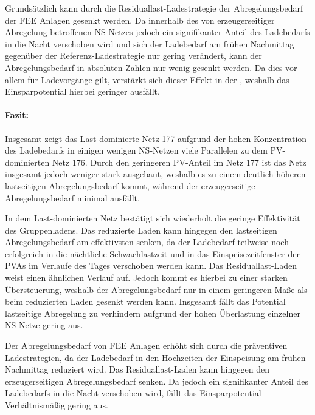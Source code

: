 

Grundsätzlich kann durch die Residuallast-Ladestrategie der Abregelungsbedarf der \gls{FEE} Anlagen gesenkt werden.
Da innerhalb des von erzeugerseitiger Abregelung betroffenen \gls{NS}-Netzes jedoch ein signifikanter Anteil des Ladebedarfs in die Nacht verschoben wird und sich der Ladebedarf am frühen Nachmittag gegenüber der Referenz-Ladestrategie nur gering verändert, kann der Abregelungsbedarf in absoluten Zahlen nur wenig gesenkt werden.
Da dies vor allem für Ladevorgänge \zH gilt, verstärkt sich dieser Effekt in der \SzeFirmenparkplatzdot, weshalb das Einsparpotential hierbei geringer ausfällt.


\paragraph{Fazit:}

Insgesamt zeigt das Last-dominierte Netz \num{177} aufgrund der hohen Konzentration des Ladebedarfs in einigen wenigen \gls{NS}-Netzen viele Parallelen zu dem \gls{PV}-dominierten Netz \num{176}.
Durch den geringeren \gls{PV}-Anteil im Netz \num{177} ist das Netz insgesamt jedoch weniger stark ausgebaut, weshalb es zu einem deutlich höheren lastseitigen Abregelungsbedarf kommt, während der erzeugerseitige Abregelungsbedarf minimal ausfällt.\medskip

In dem Last-dominierten Netz bestätigt sich wiederholt die geringe Effektivität des Gruppenladens.
Das reduzierte Laden kann hingegen den lastseitigen Abregelungsbedarf am effektivsten senken, da der Ladebedarf teilweise noch erfolgreich in die nächtliche Schwachlastzeit und in das Einspeisezeitfenster der \glspl{PVA} im Verlaufe des Tages verschoben werden kann.
Das Residuallast-Laden weist einen ähnlichen Verlauf auf.
Jedoch kommt es hierbei zu einer starken Übersteuerung, weshalb der Abregelungsbedarf nur in einem geringeren Maße als beim reduzierten Laden gesenkt werden kann.
Insgesamt fällt das Potential lastseitige Abregelung zu verhindern aufgrund der hohen Überlastung einzelner \gls{NS}-Netze gering aus.\medskip

Der Abregelungsbedarf von \gls{FEE} Anlagen erhöht sich durch die präventiven Ladestrategien, da der Ladebedarf in den Hochzeiten der Einspeisung am frühen Nachmittag reduziert wird.
Das Residuallast-Laden kann hingegen den erzeugerseitigen Abregelungsbedarf senken.
Da jedoch ein signifikanter Anteil des Ladebedarfs \zH in die Nacht verschoben wird, fällt das Einsparpotential Verhältnismäßig gering aus.

\clearpage
